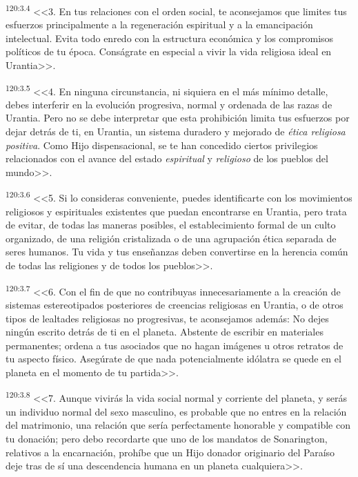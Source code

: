 \par 
\textsuperscript{120:3.4} <<3. En tus relaciones con el orden social, te aconsejamos que limites tus esfuerzos principalmente a la regeneración espiritual y a la emancipación intelectual. Evita todo enredo con la estructura económica y los compromisos políticos de tu época. Conságrate en especial a vivir la vida religiosa ideal en Urantia>>.

\par 
\textsuperscript{120:3.5} <<4. En ninguna circunstancia, ni siquiera en el más mínimo detalle, debes interferir en la evolución progresiva, normal y ordenada de las razas de Urantia. Pero no se debe interpretar que esta prohibición limita tus esfuerzos por dejar detrás de ti, en Urantia, un sistema duradero y mejorado de \textit{ética religiosa positiva}. Como Hijo dispensacional, se te han concedido ciertos privilegios relacionados con el avance del estado \textit{espiritual} y \textit{religioso} de los pueblos del mundo>>.

\par 
\textsuperscript{120:3.6} <<5. Si lo consideras conveniente, puedes identificarte con los movimientos religiosos y espirituales existentes que puedan encontrarse en Urantia, pero trata de evitar, de todas las maneras posibles, el establecimiento formal de un culto organizado, de una religión cristalizada o de una agrupación ética separada de seres humanos. Tu vida y tus enseñanzas deben convertirse en la herencia común de todas las religiones y de todos los pueblos>>.

\par 
\textsuperscript{120:3.7} <<6. Con el fin de que no contribuyas innecesariamente a la creación de sistemas estereotipados posteriores de creencias religiosas en Urantia, o de otros tipos de lealtades religiosas no progresivas, te aconsejamos además: No dejes ningún escrito detrás de ti en el planeta. Abstente de escribir en materiales permanentes; ordena a tus asociados que no hagan imágenes u otros retratos de tu aspecto físico. Asegúrate de que nada potencialmente idólatra se quede en el planeta en el momento de tu partida>>.

\par 
\textsuperscript{120:3.8} <<7. Aunque vivirás la vida social normal y corriente del planeta, y serás un individuo normal del sexo masculino, es probable que no entres en la relación del matrimonio, una relación que sería perfectamente honorable y compatible con tu donación; pero debo recordarte que uno de los mandatos de Sonarington, relativos a la encarnación, prohíbe que un Hijo donador originario del Paraíso deje tras de sí una descendencia humana en un planeta cualquiera>>.

